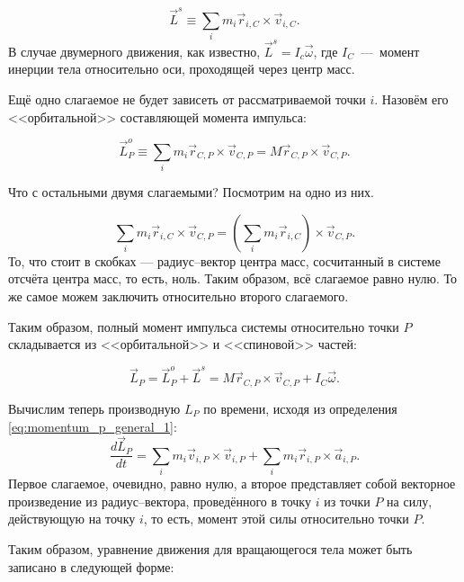 \documentclass[a4paper,12pt]{article}
\begin{document}
\begin{equation}
  \label{eq:L_spin_def}
  \vec{L}^s \equiv \sum_i m_i \vec{r}_{i,C} \times \vec{v}_{i,C}. 
\end{equation}
В случае двумерного движения, как известно, $\vec{L}^s = I_c
\vec{\omega}$, где $I_C$~---~момент инерции тела относительно оси,
проходящей через центр масс.

Ещё одно слагаемое не будет зависеть от рассматриваемой точки
$i$. Назовём его <<орбитальной>> составляющей момента импульса:

\begin{equation}
  \label{eq:L_orb_def}
  \vec{L}_P^o \equiv \sum_i m_i \vec{r}_{C,P} \times \vec{v}_{C,P} = M
  \vec{r}_{C,P} \times \vec{v}_{C,P}.
\end{equation}

Что с остальными двумя слагаемыми? Посмотрим на одно из них.

\begin{equation}
  \label{eq:L_trash_1}
  \sum_i m_i \vec{r}_{i,C} \times \vec{v}_{C,P} = \left( \sum_i m_i
    \vec{r}_{i,C} \right) \times \vec{v}_{C,P}. 
\end{equation}
То, что стоит в скобках --- радиус--вектор центра масс, сосчитанный в
системе отсчёта центра масс, то есть, ноль. Таким образом, всё
слагаемое равно нулю. То же самое можем заключить относительно второго
слагаемого.

Таким образом, полный момент импульса системы относительно точки $P$
складывается из <<орбитальной>> и <<спиновой>> частей:

\begin{equation}
  \label{eq:L_full_general}
  \vec{L}_{P} = \vec{L}_P^o + \vec{L}^s = M \vec{r}_{C,P} \times
  \vec{v}_{C,P} + I_C \vec{\omega}. 
\end{equation}

Вычислим теперь производную $L_{P}$ по времени, исходя из определения
\eqref{eq:momentum_p_general_1}:
\begin{equation}
  \label{eq:dL/dt}
  \frac{d\vec{L}_P}{dt} = \sum_i m_i \vec{v}_{i,P} \times
  \vec{v}_{i,P} + \sum_i m_i \vec{r}_{i,P} \times \vec{a}_{i,P}. 
\end{equation}
Первое слагаемое, очевидно, равно нулю, а второе представляет собой
векторное произведение из радиус--вектора, проведённого в точку $i$ из
точки $P$ на силу, действующую на точку $i$, то есть, момент этой силы
относительно точки $P$.

Таким образом, уравнение движения для вращающегося тела может быть
записано в следующей форме:
\end{document}

